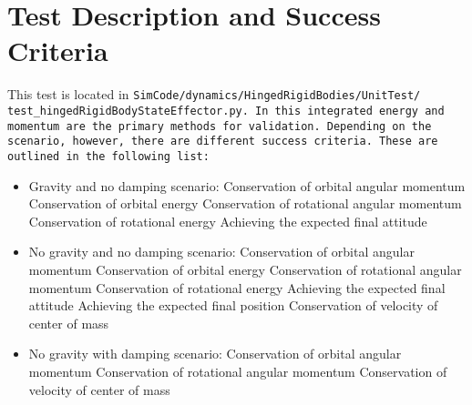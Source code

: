 \section{Test Description and Success Criteria}
This test is located in \tt SimCode/dynamics/HingedRigidBodies/UnitTest/\newline
test\_hingedRigidBodyStateEffector.py. In this integrated energy and momentum are the primary methods for validation. Depending on the scenario, however, there are different success criteria. These are outlined in the following list:
\begin{itemize}
	\item Gravity and no damping scenario:
	\subitem Conservation of orbital angular momentum
	\subitem Conservation of orbital energy
	\subitem Conservation of rotational angular momentum
	\subitem Conservation of rotational energy
	\subitem Achieving the expected final attitude
	\item No gravity and no damping scenario:
\subitem Conservation of orbital angular momentum
\subitem Conservation of orbital energy
\subitem Conservation of rotational angular momentum
\subitem Conservation of rotational energy
\subitem Achieving the expected final attitude
\subitem Achieving the expected final position
\subitem Conservation of velocity of center of mass
	\item No gravity with damping scenario:
\subitem Conservation of orbital angular momentum
\subitem Conservation of rotational angular momentum
\subitem Conservation of velocity of center of mass

\end{itemize}

